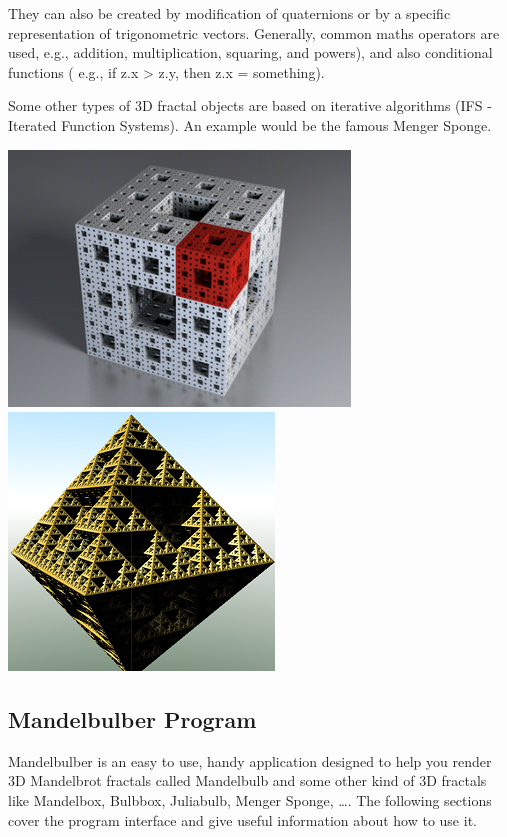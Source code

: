 They can also be created by modification of quaternions or by a specific
representation of trigonometric vectors. Generally, common maths
operators are used, e.g., addition, multiplication, squaring, and
powers), and also conditional functions ( e.g., if z.x \textgreater{}
z.y, then z.x = something).

Some other types of 3D fractal objects are based on iterative algorithms
(IFS - Iterated Function Systems). An example would be the famous Menger
Sponge.

\includegraphics[width=3.57768in,height=2.68571in]{img/manual/media/image2.png}
\includegraphics[width=2.77917in,height=2.69792in]{img/manual/media/image3.png}

\subsection{Mandelbulber Program}\label{mandelbulber-program}

Mandelbulber is an easy to use, handy application designed to help you
render 3D Mandelbrot fractals called Mandelbulb and some other kind of
3D fractals like Mandelbox, Bulbbox, Juliabulb, Menger Sponge, \ldots{}.
The following sections cover the program interface and give useful
information about how to use it.


